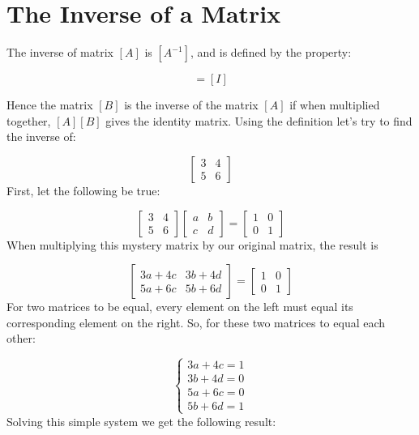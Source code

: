 \section{The Inverse of a Matrix}\label{the-inverse-of-a-matrix}

The inverse of matrix $[A]$ is $[A^{-1}]$, and is defined by the property:

\begin{equation} 
[A][A^{-1}]=[I] 
\end{equation}

Hence the matrix $[B]$ is the inverse of the matrix $[A]$ if when multiplied together, $[A][B]$ gives the identity matrix. 
Using the definition let's try to find the inverse of:

\begin{equation*}
\begin{bmatrix}
3 & 4\\
5 & 6
\end{bmatrix}
\end{equation*}
First, let the following be true:

\begin{equation*}
\begin{bmatrix}
3 & 4\\
5 & 6
\end{bmatrix}
\begin{bmatrix}
a & b\\
c & d
\end{bmatrix}
=
\begin{bmatrix}
1 & 0\\
0 & 1
\end{bmatrix}
\end{equation*}
When multiplying this mystery matrix by our original matrix, the result is

\begin{equation*}
\begin{bmatrix}
3a+4c & 3b+4d\\
5a+6c & 5b+6d
\end{bmatrix}
=
\begin{bmatrix}
1 & 0\\
0 & 1
\end{bmatrix}
\end{equation*}
For two matrices to be equal, every element on the left must equal its corresponding element on the right. So, for these two matrices to equal each other:

\begin{equation*}
\begin{cases}
3a+4c=1\\
3b+4d=0\\
5a+6c=0\\
5b+6d=1
\end{cases}
\end{equation*}
Solving this simple system we get the following result:

